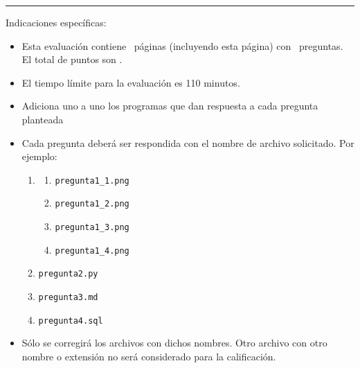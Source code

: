 \documentclass[12pt]{exam}
\newcommand{\timelimit}{110 minutos}
\begin{document}
\rule[2ex]{\textwidth}{2pt}
\Large Indicaciones específicas:
\normalsize
\begin{itemize}
  \item Esta evaluación contiene \numpages\ páginas (incluyendo esta página) con \numquestions\ preguntas. El total de puntos son \numpoints.
  \item El tiempo límite para la evaluación es \timelimit.
  \item Adiciona uno a uno los programas que dan respuesta a cada pregunta planteada
  \item Cada pregunta deberá ser respondida con el nombre de archivo solicitado.  Por ejemplo:
  \begin{enumerate}
    \item\begin{enumerate}
      \item \texttt{pregunta1\_1.png}
      \item \texttt{pregunta1\_2.png}
      \item \texttt{pregunta1\_3.png}
      \item \texttt{pregunta1\_4.png}
    \end{enumerate}
    
    \item \texttt{pregunta2.py}
    \item \texttt{pregunta3.md}
    \item \texttt{pregunta4.sql}
  
  \end{enumerate}

  \item Sólo se corregirá los archivos con dichos nombres. Otro archivo con otro nombre o extensión no será considerado para la calificación.
\end{itemize}


\end{document}
